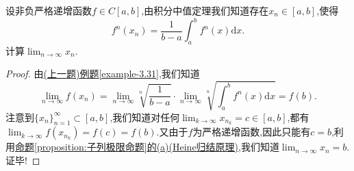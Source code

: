 \documentclass[../../main.tex]{subfiles}
\begin{document}
\begin{example}
设非负严格递增函数\(f \in C[a,b]\),由积分中值定理我们知道存在\(x_n \in [a,b]\),使得
\[
f^n(x_n) = \frac{1}{b - a} \int_{a}^{b} f^n(x)\mathrm{d}x.
\]
计算\(\lim_{n \to \infty} x_n\).
\end{example}
\begin{proof}
由\hyperref[example-3.31]{(上一题)例题\ref{example-3.31}},我们知道
\[
\lim_{n \to \infty} f(x_n) = \lim_{n \to \infty} \sqrt[n]{\frac{1}{b - a}} \cdot \lim_{n \to \infty} \sqrt[n]{\int_{a}^{b} f^n(x)\mathrm{d}x} = f(b).
\]
注意到\(\{x_n\}_{n = 1}^{\infty} \subset [a,b]\),我们知道对任何\(\lim_{k \to \infty} x_{n_k} = c \in [a,b]\),都有\(\lim_{k \to \infty} f(x_{n_k}) = f(c) = f(b)\).又由于$f$为严格递增函数,因此只能有\(c = b\),利用\hyperref[proposition:子列极限命题]{命题\ref{proposition:子列极限命题}的(a)(Heine归结原理)},我们知道\(\lim_{n \to \infty} x_n = b\).证毕!
\end{proof}
\end{document}

